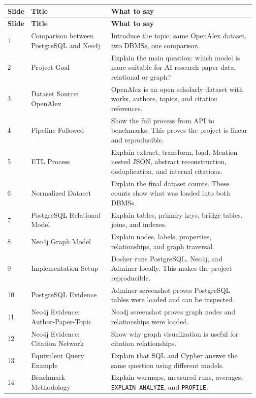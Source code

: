\documentclass[11pt]{article}
\begin{document}
\begin{longtable}{|p{}|p{}|p{}|}
\hline
\textbf{Slide} & \textbf{Title} & \textbf{What to say} \\
\hline
\endfirsthead
\hline
\textbf{Slide} & \textbf{Title} & \textbf{What to say} \\
\hline
\endhead
1 & Comparison between PostgreSQL and Neo4j & Introduce the topic: same OpenAlex dataset, two DBMSs, one comparison. \\
\hline
2 & Project Goal & Explain the main question: which model is more suitable for AI research paper data, relational or graph? \\
\hline
3 & Dataset Source: OpenAlex & OpenAlex is an open scholarly dataset with works, authors, topics, and citation references. \\
\hline
4 & Pipeline Followed & Show the full process from API to benchmarks. This proves the project is linear and reproducible. \\
\hline
5 & ETL Process & Explain extract, transform, load. Mention nested JSON, abstract reconstruction, deduplication, and internal citations. \\
\hline
6 & Normalized Dataset & Explain the final dataset counts. These counts show what was loaded into both DBMSs. \\
\hline
7 & PostgreSQL Relational Model & Explain tables, primary keys, bridge tables, joins, and indexes. \\
\hline
8 & Neo4j Graph Model & Explain nodes, labels, properties, relationships, and graph traversal. \\
\hline
9 & Implementation Setup & Docker runs PostgreSQL, Neo4j, and Adminer locally. This makes the project reproducible. \\
\hline
10 & PostgreSQL Evidence & Adminer screenshot proves PostgreSQL tables were loaded and can be inspected. \\
\hline
11 & Neo4j Evidence: Author-Paper-Topic & Neo4j screenshot proves graph nodes and relationships were loaded. \\
\hline
12 & Neo4j Evidence: Citation Network & Show why graph visualization is useful for citation relationships. \\
\hline
13 & Equivalent Query Example & Explain that SQL and Cypher answer the same question using different models. \\
\hline
14 & Benchmark Methodology & Explain warmups, measured runs, averages, \texttt{EXPLAIN ANALYZE}, and \texttt{PROFILE}. \\

\end{longtable}
\end{document}
